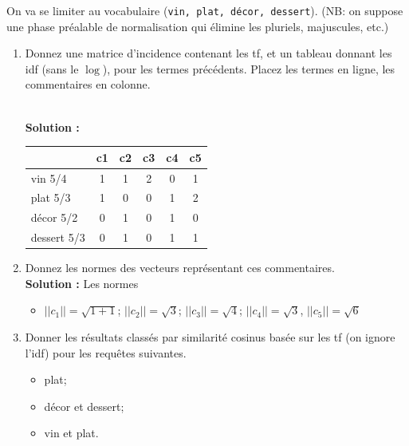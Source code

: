 \documentclass[11pt,a4paper]{article}
\newenvironment{solution}[0]{
~\\ \color{red} \textbf{Solution : }\color{black}}{%
}
\begin{document}
\bigskip

On va se limiter au vocabulaire (\texttt{vin, plat, décor, dessert}).
(NB: on suppose
     une phase préalable de normalisation qui élimine les pluriels, majuscules, etc.)

\begin{enumerate}
   \item Donnez une matrice d'incidence contenant les tf, 
      et un tableau donnant les idf (sans le $\log$), pour les  termes précédents. Placez
      les termes en ligne, les commentaires en colonne.

\begin{solution}
\begin{center}
\begin{tabular}{l|c|c|c|c|c}
            & \textbf{c1} & \textbf{c2} & \textbf{c3} &\textbf{c4}&\textbf{c5} \\ \hline  
   vin  5/4   & 1           & 1           & 2           & 0         & 1\\
   plat 5/3  & 1           & 0           & 0           & 1         & 2\\
   décor 5/2  & 0           & 1           & 0           & 1         & 0\\
   dessert 5/3  & 0           & 1           & 0           & 1         & 1\\\hline
   \end{tabular}
\end{center}
\end{solution}

  \item Donnez les normes des vecteurs représentant ces commentaires.
\begin{solution}
Les normes
\begin{itemize}
  \item $||c_1|| = \sqrt{1+ 1}$; $||c_2|| = \sqrt{3}$; $||c_3|| = \sqrt{4}$; 
    $||c_4|| = \sqrt{3}$, $||c_5|| = \sqrt{6}$  
\end{itemize}
\end{solution}
  
  \item Donner les résultats classés par similarité cosinus basée sur les tf 
  (on ignore l'idf) pour les requêtes suivantes. 
  
  \begin{itemize}
    \item plat;
    \item décor et dessert;
    \item vin et plat.
  \end{itemize}


\end{enumerate}
\end{document}
